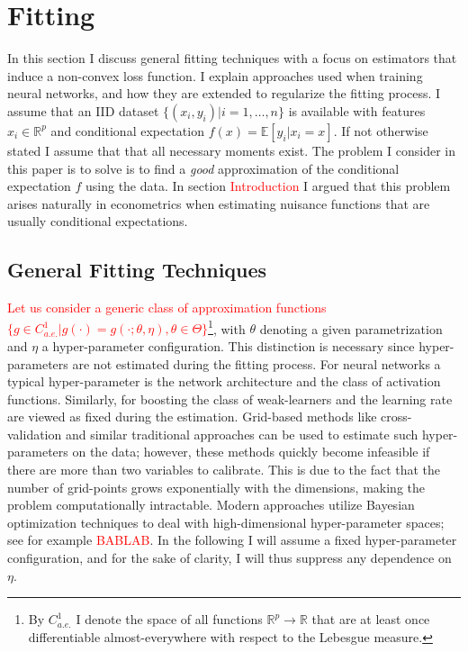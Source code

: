 \section{Fitting}

In this section I discuss general fitting techniques with a focus on estimators that
induce a non-convex loss function. I explain approaches used when training neural
networks, and how they are extended to regularize the fitting process. I assume that an
IID dataset $\{(x_i, y_i) | i = 1, \dots, n\}$ is available with features $x_i \in
\mathbb{R}^p$ and conditional expectation $f(x) = \mathbb{E}[y_i | x_i = x]$. If not
otherwise stated I assume that that all necessary moments exist. The problem I consider
in this paper is to solve is to find a \emph{good} approximation of the conditional
expectation $f$ using the data. In section \textcolor{red}{Introduction} I argued that
this problem arises naturally in econometrics when estimating nuisance functions that
are usually conditional expectations.

\subsection{General Fitting Techniques}

\textcolor{red}{
Let us consider a generic class of approximation functions $\{g \in C_{a.e.}^1 |
g(\cdot) = g(\cdot; \theta, \eta), \theta \in \Theta\}$}\footnote{By $C_{a.e.}^1$ I
denote the space of all functions $\mathbb{R}^p \to \mathbb{R}$ that are at least once
differentiable almost-everywhere with respect to the Lebesgue measure.}, with $\theta$
denoting a given parametrization and $\eta$ a hyper-parameter configuration. This
distinction is necessary since hyper-parameters are not estimated during the fitting
process. For neural networks a typical hyper-parameter is the network architecture and
the class of activation functions. Similarly, for boosting the class of weak-learners
and the learning rate are viewed as fixed during the estimation. Grid-based methods like
cross-validation and similar traditional approaches can be used to estimate such
hyper-parameters on the data; however, these methods quickly become infeasible if there
are more than two variables to calibrate. This is due to the fact that the number of
grid-points grows exponentially with the dimensions, making the problem computationally
intractable. Modern approaches utilize Bayesian optimization techniques to deal with
high-dimensional hyper-parameter spaces; see for example \textcolor{red}{BABLAB}. In the
following I will assume a fixed hyper-parameter configuration, and for the sake of
clarity, I will thus suppress any dependence on $\eta$.

